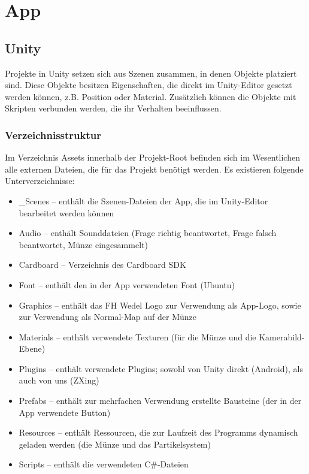 \chapter{App}
\section{Unity}
\label{sec:Unity}
Projekte in Unity setzen sich aus Szenen zusammen, in denen Objekte platziert sind. Diese Objekte besitzen Eigenschaften, die direkt im Unity-Editor gesetzt werden können, z.B. Position oder Material. Zusätzlich können die Objekte mit Skripten verbunden werden, die ihr Verhalten beeinflussen.

\subsection{Verzeichnisstruktur}
\label{sec:Verzeichnisstruktur}
Im Verzeichnis Assets innerhalb der Projekt-Root befinden sich im Wesentlichen alle externen Dateien, die für das Projekt benötigt werden. Es existieren folgende Unterverzeichnisse:

\begin{itemize}
  \item \_Scenes -- enthält die Szenen-Dateien der App, die im Unity-Editor bearbeitet werden können
  \item Audio -- enthält Sounddateien (Frage richtig beantwortet, Frage falsch beantwortet, Münze eingesammelt)
  \item Cardboard -- Verzeichnis des Cardboard SDK
  \item Font -- enthält den in der App verwendeten Font (Ubuntu)
  \item Graphics -- enthält das FH Wedel Logo zur Verwendung als App-Logo, sowie zur Verwendung als Normal-Map auf der Münze
  \item Materials -- enthält verwendete Texturen (für die Münze und die Ka\-me\-ra\-bild-Ebene)
  \item Plugins -- enthält verwendete Plugins; sowohl von Unity direkt (Android), als auch von uns (ZXing)
  \item Prefabs -- enthält zur mehrfachen  Verwendung erstellte Bausteine (der in der App verwendete Button)
  \item Resources -- enthält Ressourcen, die zur Laufzeit des Programms dynamisch geladen werden (die Münze und das Partikelsystem)
  \item Scripts -- enthält die verwendeten C\#-Dateien
\end{itemize}

